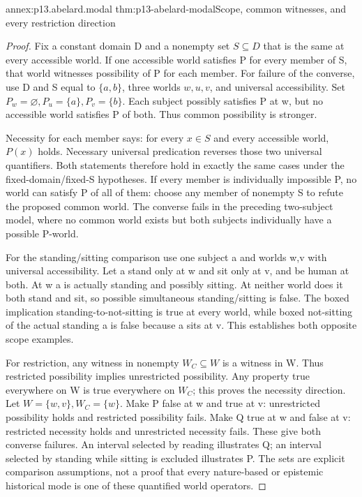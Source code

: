 \begin{annexitem}{annex:p13.abelard.modal}
 {thm:p13-abelard-modal}{Scope, common witnesses, and every restriction direction}
\begin{proof}
Fix a constant domain D and a nonempty set \(S\subseteq D\)
that is the same at every accessible world.
If one accessible world satisfies P for every member of S,
that world witnesses possibility of P for each member.
For failure of the converse, use D and S equal to \(\{a,b\}\),
three worlds \(w,u,v\), and universal accessibility.
Set \(P_w=\varnothing,P_u=\{a\},P_v=\{b\}\).
Each subject possibly satisfies P at w, but no accessible world
satisfies P of both. Thus common possibility is stronger.

Necessity for each member says: for every \(x\in S\)
and every accessible world, \(P(x)\) holds.
Necessary universal predication reverses those two universal
quantifiers. Both statements therefore hold in exactly the
same cases under the fixed-domain/fixed-S hypotheses.
If every member is individually impossible P, no world can
satisfy P of all of them: choose any member of nonempty S
to refute the proposed common world. The converse fails
in the preceding two-subject model, where no common world
exists but both subjects individually have a possible P-world.

For the standing/sitting comparison use one subject a and
worlds w,v with universal accessibility. Let a stand only
at w and sit only at v, and be human at both.
At w a is actually standing and possibly sitting.
At neither world does it both stand and sit, so possible
simultaneous standing/sitting is false.
The boxed implication standing-to-not-sitting is true
at every world, while boxed not-sitting of the actual
standing a is false because a sits at v.
This establishes both opposite scope examples.

For restriction, any witness in nonempty \(W_C\subseteq W\)
is a witness in W. Thus restricted possibility implies
unrestricted possibility. Any property true everywhere
on W is true everywhere on \(W_C\); this proves the
necessity direction.
Let \(W=\{w,v\},W_C=\{w\}\).
Make P false at w and true at v: unrestricted possibility
holds and restricted possibility fails.
Make Q true at w and false at v: restricted necessity
holds and unrestricted necessity fails.
These give both converse failures.
An interval selected by reading illustrates Q; an interval
selected by standing while sitting is excluded illustrates P.
The sets are explicit comparison assumptions, not a proof
that every nature-based or epistemic historical mode is
one of these quantified world operators.
\end{proof}
\end{annexitem}

